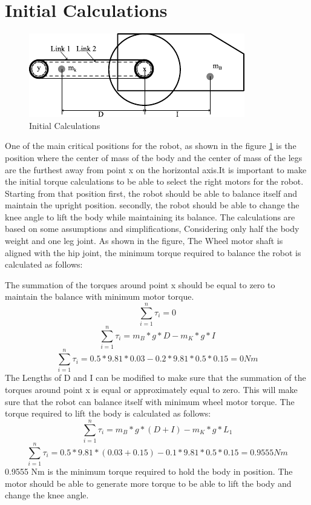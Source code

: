 \section{Initial Calculations}
\begin{figure}[h]
	\centering
	\includegraphics[width=0.7\linewidth]{Initial Calculations}
	\caption[Initial Calculations]{Initial Calculations}
	\label{fig:initialcalculations}
\end{figure}
One of the main critical positions for the robot, as shown in the figure \ref{fig:initialcalculations} is the position where the center of mass of the body and the center of mass of the legs are the furthest away from point x on the horizontal axis.It is important to make the initial torque calculations to be able to select the right motors for the robot.
Starting from that position first, the robot should be able to balance itself and maintain the upright position.
secondly, the robot should be able to change the knee angle to lift the body while maintaining its balance.
The calculations are based on some assumptions and simplifications, Considering only half the body weight and one leg joint.
As shown in the figure, The Wheel motor shaft is aligned with the hip joint, the minimum torque required to balance the robot is calculated as follows:

The summation of the torques around point x should be equal to zero to maintain the balance with minimum motor torque.
\begin{equation}
	\sum_{i=1}^{n} \tau_{i}=0
\end{equation}
\begin{equation}
	\sum_{i=1}^{n} \tau_{i}=m_{B}*g*D-m_{K}*g*I
\end{equation}
\begin{equation}
	\sum_{i=1}^{n} \tau_{i}=0.5*9.81*0.03-0.2*9.81*0.5*0.15=0 Nm
\end{equation}
The Lengths of D and I can be modified to make sure that the summation of the torques around point x is equal or approximately equal to zero.
This will make sure that the robot can balance itself with minimum wheel motor torque.
The torque required to lift the body is calculated as follows:
\begin{equation}
	\sum_{i=1}^{n} \tau_{i}=m_{B}*g*(D+I)-m_{K}*g*L_{1}
\end{equation}
\begin{equation}
	\sum_{i=1}^{n} \tau_{i}=0.5*9.81*(0.03+0.15)-0.1*9.81*0.5*0.15=0.9555 Nm
\end{equation}
0.9555 Nm is the minimum torque required to hold the body in position.
The motor should be able to generate more torque to be able to lift the body and change the knee angle.

